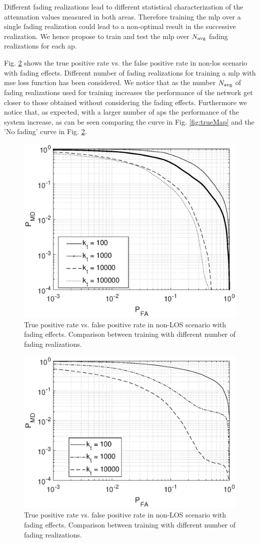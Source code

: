 \documentclass[draftcls,onecolumn,12pt]{IEEEtran}
\begin{document}
Different fading realizations lead to different statistical characterization of the attenuation values measured in both areas. Therefore training the \ac{mlp} over a single fading realization could lead to a non-optimal result in the successive realization. We hence propose to train and test the \ac{mlp} over $N_{\rm avg}$ fading realizations for each \ac{ap}.

Fig. \ref{fig:faded} shows the true positive rate vs. the false positive rate in non-\ac{los} scenario with fading effects. Different number of fading realizations for training a \ac{mlp} with \ac{mse} loss function has been considered. We notice that as the number $N_{\rm avg}$ of fading realizations used for training increases the performance of the network get closer to those obtained without considering the fading effects. Furthermore we notice that, as expected, with a larger number of \acp{ap} the performance of the system increase, as can be seen comparing the curve in Fig. \ref{fig:trueMap} and the 'No fading' curve in Fig. \ref{fig:faded}.


\begin{figure}
    \centering
    \includegraphics[width=0.5\columnwidth]{res_avg_nTrain.eps}
    \caption{True positive rate vs. false positive rate in non-LOS scenario with fading effects. Comparison between training with different number of fading realizations.}
    \label{fig:faded}
\end{figure}


\begin{figure}
    \centering
    \includegraphics[width=0.5\columnwidth]{res_avg_nTrain_SVM.eps}
    \caption{True positive rate vs. false positive rate in non-LOS scenario with fading effects. Comparison between training with different number of fading realizations.}
    \label{fig:faded}
\end{figure}
\end{document}
